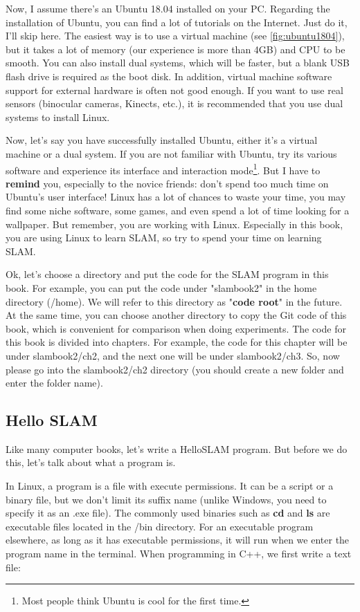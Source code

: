 Now, I assume there's an Ubuntu 18.04 installed on your PC. Regarding the installation of Ubuntu, you can find a lot of tutorials on the Internet. Just do it, I'll skip here. The easiest way is to use a virtual machine (see \autoref{fig:ubuntu1804}), but it takes a lot of memory (our experience is more than 4GB) and CPU to be smooth. You can also install dual systems, which will be faster, but a blank USB flash drive is required as the boot disk. In addition, virtual machine software support for external hardware is often not good enough. If you want to use real sensors (binocular cameras, Kinects, etc.), it is recommended that you use dual systems to install Linux.

Now, let's say you have successfully installed Ubuntu, either it's a virtual machine or a dual system. If you are not familiar with Ubuntu, try its various software and experience its interface and interaction mode\footnote{Most people think Ubuntu is cool for the first time. }. But I have to \textbf{remind} you, especially to the novice friends: don't spend too much time on Ubuntu's user interface! Linux has a lot of chances to waste your time, you may find some niche software, some games, and even spend a lot of time looking for a wallpaper. But remember, you are working with Linux. Especially in this book, you are using Linux to learn SLAM, so try to spend your time on learning SLAM.

Ok, let's choose a directory and put the code for the SLAM program in this book. For example, you can put the code under "slambook2" in the home directory (/home). We will refer to this directory as "\textbf{code root}" in the future. At the same time, you can choose another directory to copy the Git code of this book, which is convenient for comparison when doing experiments. The code for this book is divided into chapters. For example, the code for this chapter will be under slambook2/ch2, and the next one will be under slambook2/ch3. So, now please go into the slambook2/ch2 directory (you should create a new folder and enter the folder name).

\subsection{Hello SLAM}
Like many computer books, let's write a HelloSLAM program. But before we do this, let's talk about what a program is.

In Linux, a program is a file with execute permissions. It can be a script or a binary file, but we don't limit its suffix name (unlike Windows, you need to specify it as an .exe file). The commonly used binaries such as \textbf{cd} and \textbf{ls} are executable files located in the /bin directory. For an executable program elsewhere, as long as it has executable permissions, it will run when we enter the program name in the terminal. When programming in C++, we first write a text file:

